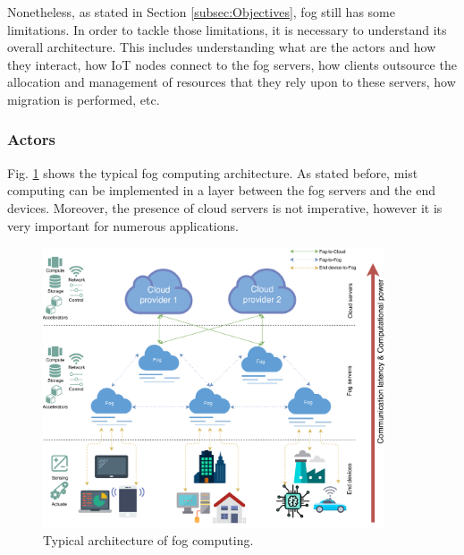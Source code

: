 Nonetheless, as stated in Section \ref{subsec:Objectives}, fog still has some limitations. In order to tackle those limitations, it is necessary to understand its overall architecture. This includes understanding what are the actors and how they interact, how IoT nodes connect to the fog servers, how clients outsource the allocation and management of resources that they rely upon to these servers, how migration is performed, etc.

\subsubsection{Actors}
\noindent\tab Fig. \ref{fog_architecture} shows the typical fog computing architecture. As stated before, mist computing can be implemented in a layer between the fog servers and the end devices. Moreover, the presence of cloud servers is not imperative, however it is very important for numerous applications.

\begin{figure} [t]
	\centering
	\includegraphics[width=0.9\textwidth]{images/fog_architecture/fog_architecture}
	\caption{Typical architecture of fog computing.}
	\label{fog_architecture}
\end{figure}

